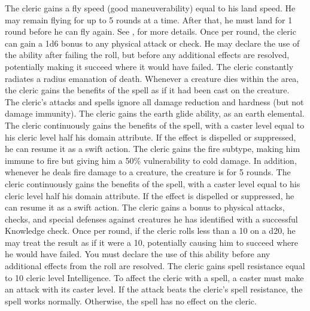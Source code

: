 The cleric gains a fly speed (good maneuverability) equal to his land speed.
He may remain flying for up to 5 rounds at a time.
After that, he must land for 1 round before he can fly again.
See , for more details.
Once per round, the cleric can gain a \plus1d6 bonus to any physical attack or check.
He may declare the use of the ability after failing the roll, but before any additional effects are resolved, potentially making it succeed where it would have failed.
The cleric constantly radiates a \areamed radius emanation of death.
Whenever a creature dies within the area, the cleric gains the benefits of the  spell as if it had been cast on the creature.
The cleric's attacks and spells ignore all damage reduction and hardness (but not damage immunity).
The cleric gains the earth glide ability, as an earth elemental.
 The cleric continuously gains the benefits of the 
spell, with a caster level equal to his cleric level \add half his domain attribute.
If the effect is dispelled or suppressed, he can resume it as a swift action.
The cleric gains the fire subtype, making him immune to fire but giving him a 50\% vulnerability to cold damage.
In addition, whenever he deals fire damage to a creature, the creature is \ignited for 5 rounds.
 The cleric continuously gains the benefits of the 
spell, with a caster level equal to his cleric level \add half his domain attribute.
If the effect is dispelled or suppressed, he can resume it as a swift action.
The cleric gains a  bonus to physical attacks, checks, and special defenses against creatures he has identified with a successful Knowledge check.
Once per round, if the cleric rolls less than a 10 on a d20, he may treat the result as if it were a 10, potentially causing him to succeed where he would have failed.
You must declare the use of this ability before any additional effects from the roll are resolved.
The cleric gains spell resistance equal to 10 \add cleric level \add Intelligence.
To affect the cleric with a spell, a caster must make an attack with its caster level.
If the attack beats the cleric's spell resistance, the spell works normally.
Otherwise, the spell has no effect on the cleric.

